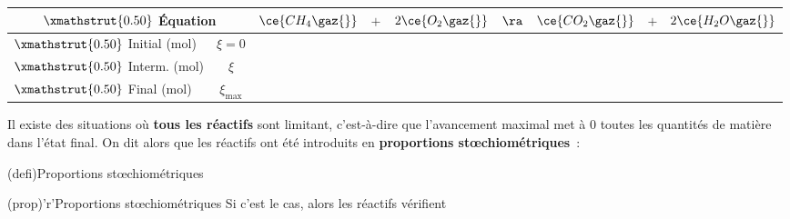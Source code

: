 \documentclass[../../main/main.tex]{subfiles}
\begin{document}
\begin{center}
	\def\rhgt{0.50}
	\centering
	\begin{tabularx}{\linewidth}{|l|c|YdYdYdY|}
		\hline
		\multicolumn{2}{|c|}{
			$\xmathstrut{\rhgt}$
		\textbf{Équation}} &
		$\ce{CH_4\gaz{}}$  & $+$          &
		$2\ce{O_2\gaz{}}$  & $\ra$        &
		$\ce{CO_2\gaz{}}$  & $+$          &
		$2\ce{H_2O\gaz{}}$                  \\
		\hline
		$\xmathstrut{\rhgt}$
		Initial (\si{mol}) & $\xi = 0$    &
		          & \vline       &
		          & \vline       &
		          & \vline       &
		                           \\
		\hline
		$\xmathstrut{\rhgt}$
		Interm. (\si{mol}) & $\xi$        &
		    & \vline       &
		   & \vline       &
		    & \vline       &
		                    \\
		\hline
		$\xmathstrut{\rhgt}$
		Final (\si{mol})   & $\xi_{\max}$ &
		  & \vline       &
		    & \vline       &
		  & \vline       &
		                     \\
		\hline
	\end{tabularx}
\end{center}

Il existe des situations où \textbf{tous les réactifs} sont limitant,
c'est-à-dire que l'avancement maximal met à $0$ toutes les quantités de matière
dans l'état final. On dit alors que les réactifs ont été introduits en
\textbf{proportions stœchiométriques}~:

\begin{tcbraster}[raster columns=2, raster equal height=rows]
	\begin{tcb}[label=def:propsto, cnt, bld](defi){Proportions stœchiométriques}
	\end{tcb}
	\begin{tcb}(prop)'r'{Proportions stœchiométriques}
		Si c'est le cas, alors les réactifs vérifient
	\end{tcb}
\end{tcbraster}
\end{document}
